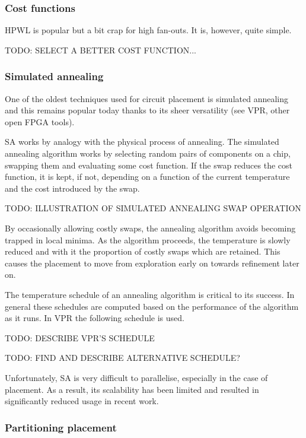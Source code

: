 			\subsubsection{Cost functions}
				
				HPWL is popular but a bit crap for high fan-outs. It is, however, quite
				simple.
				
				TODO: SELECT A BETTER COST FUNCTION...
			
			\subsubsection{Simulated annealing}
				
				One of the oldest techniques used for circuit placement is simulated
				annealing and this remains popular today thanks to its sheer
				versatility (see VPR, other open FPGA tools).
				
				SA works by analogy with the physical process of annealing.
				The simulated annealing algorithm works by selecting random pairs of
				components on a chip, swapping them and evaluating some cost function.
				If the swap reduces the cost function, it is kept, if not, depending on
				a function of the current temperature and the cost introduced by the
				swap.
				
				TODO: ILLUSTRATION OF SIMULATED ANNEALING SWAP OPERATION
				
				By occasionally allowing costly swaps, the annealing algorithm avoids
				becoming trapped in local minima. As the algorithm proceeds, the
				temperature is slowly reduced and with it the proportion of costly
				swaps which are retained. This causes the placement to move from
				exploration early on towards refinement later on.
				
				The temperature schedule of an annealing algorithm is critical to its
				success. In general these schedules are computed based on the
				performance of the algorithm as it runs. In VPR the following schedule
				is used.
				
				TODO: DESCRIBE VPR'S SCHEDULE
				
				TODO: FIND AND DESCRIBE ALTERNATIVE SCHEDULE?
				
				Unfortunately, SA is very difficult to parallelise, especially in the
				case of placement. As a result, its scalability has been limited and
				resulted in significantly reduced usage in recent work.
			
			\subsubsection{Partitioning placement}
				
